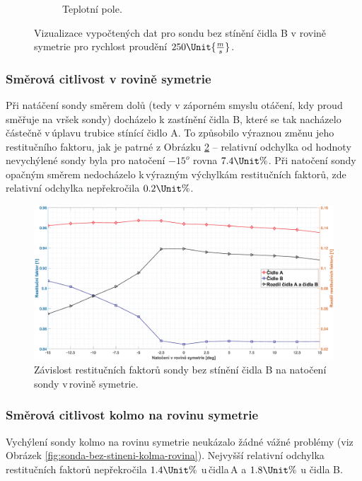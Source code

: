 \begin{figure}[ht!]
\begin{subfigure}{0.45\textwidth}
                    \caption{Teplotní pole.}
                \end{subfigure}
                \caption{Vizualizace vypočtených dat pro sondu bez stínění čidla B v rovině symetrie pro rychlost proudění $250 \Unit{\frac{m}{s}}$.}
                \label{fig:sonda-bez-stineni-vizualizace}
            \end{figure}


        \newpage
        \subsubsection{Směrová citlivost v rovině symetrie}
            Při natáčení sondy směrem dolů (tedy v záporném smyslu otáčení, kdy proud směřuje na vršek sondy) docházelo k zastínění čidla B, které se tak nacházelo částečně v\,úplavu trubice stínící čidlo A. To způsobilo výraznou změnu jeho restitučního faktoru, jak je patrné z Obrázku \ref{fig:sonda-bez-stineni-rovina-symetrie} – relativní odchylka od hodnoty nevychýlené sondy byla pro natočení $-15^o$ rovna $7.4 \Unit{\%}$. Při natočení sondy opačným směrem nedocházelo k\,výrazným výchylkám restitučních faktorů, zde relativní odchylka nepřekročila $0.2 \Unit{\%}$.
            
            \begin{figure}[ht!]
                \centering
                \includegraphics*[width=\textwidth]{400_SIMULACE_KONSTRUKCNICH_UPRAV/Grafy/01_rovina_symetrie}
                \caption{Závislost restitučních faktorů sondy bez stínění čidla B na natočení sondy v\,rovině symetrie.}
                \label{fig:sonda-bez-stineni-rovina-symetrie}
            \end{figure}
        \subsubsection{Směrová citlivost kolmo na rovinu symetrie}
            Vychýlení sondy kolmo na rovinu symetrie neukázalo žádné vážné problémy (viz Obrázek \ref{fig:sonda-bez-stineni-kolma-rovina}). Nejvyšší relativní odchylka restitučních faktorů nepřekročila $1.4 \Unit{\%}$ u\,čidla\,A a $1.8 \Unit{\%}$ u čidla B.
            
